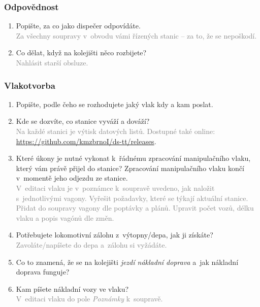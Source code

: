 \documentclass[12pt,a4paper]{article}
\newcommand{\solution}[1]{\\ \textcolor{gray}{#1}}
\newcommand{\solution}[1]{}
\begin{document}
\subsubsection*{Odpovědnost}
\begin{enumerate}[leftmargin=*]
\item Popište, za co jako dispečer odpovídáte.
\solution{Za všechny soupravy v~obvodu vámi řízených stanic – za to, že se
nepoškodí.}

\item Co dělat, když na kolejišti něco rozbijete?
\solution{Nahlásit starší obsluze.}

\end{enumerate}

\subsubsection*{Vlakotvorba}
\begin{enumerate}[leftmargin=*]
\item Popište, podle čeho se rozhodujete jaký vlak kdy a kam poslat.

\item Kde se dozvíte, co stanice vyváží a dováží?
\solution{Na každé stanici je výtisk datových listů. Dostupné také online:\\
\url{https://github.com/kmzbrnoI/ds-tt/releases}}.

\item Které úkony je nutné vykonat k~řádnému zpracování manipulačního vlaku,
který vám právě přijel do stanice? Zpracování manipulačního vlaku končí
v~momentě jeho odjezdu ze stanice.
\solution{V~editaci vlaku je v~poznámce k~soupravě uvedeno, jak naložit
s~jednotlivými vagony. Vyřešit požadavky, které se týkají aktuální stanice.
Přidat do soupravy vagony dle poptávky a plánů. Upravit počet vozů, délku
vlaku a popis vagónů dle změn.}

\item Potřebujete lokomotivní zálohu z~výtopny/depa, jak ji získáte?
\solution{Zavoláte/napíšete do depa a~zálohu si vyžádáte.}

\item Co to znamená, že se na kolejišti \textit{jezdí nákladní doprava} a~jak
nákladní doprava funguje?

\item Kam píšete nákladní vozy ve vlaku?
\solution{V~editaci vlaku do pole \textit{Poznámky} k~soupravě.}

\end{enumerate}
\end{document}
